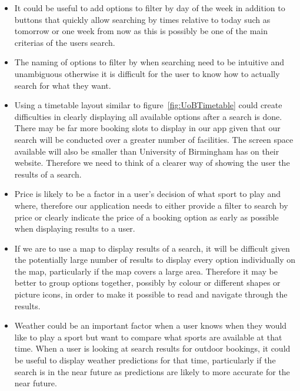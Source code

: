 \begin{itemize}
	\item It could be useful to add options to filter by day of the week in
		addition to buttons that quickly allow searching by times relative to
		today such as tomorrow or one week from now as this is possibly be one
		of the main criterias of the users search.
	\item The naming of options to filter by when searching need to be
		intuitive and unambiguous otherwise it is difficult  for the user to
		know how to actually search for what they want.
	\item Using a timetable layout similar to figure~\ref{fig:UoBTimetable}
		could create difficulties in clearly displaying all available options
		after a search is done. There may be far more booking slots to display
		in our app given that our search will be conducted over a greater
		number of facilities. The screen space available will also be smaller
		than University of Birmingham has on their website. Therefore we need
		to think of a clearer way of showing the user the results of a search.
	\item Price is likely to be a factor in a user's decision of what sport to
		play and where, therefore our application needs to either provide a
		filter to search by price or clearly indicate the price of a booking
		option as early as possible when displaying results to a user.
	\item If we are to use a map to display results of a search, it will be
		difficult given the potentially large number of results to display
		every option individually on the map, particularly if the map covers a
		large area. Therefore it may be better to group options together,
		possibly by colour or different shapes or picture icons, in order to
		make it possible to read and navigate through the results.
	\item Weather could be an important factor when a user knows when they
		would like to play a sport but want to compare what sports are
		available at that time. When a user is looking at search results for
		outdoor bookings, it could be useful to display weather predictions for
		that time, particularly if the search is in the near future as
		predictions are likely to more accurate for the near future.
\end{itemize}
